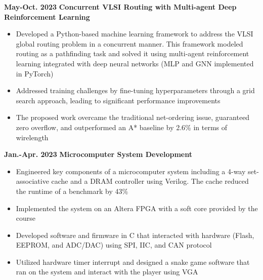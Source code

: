 \documentclass[11pt,a4paper,sans]{moderncv}
\begin{document}
\cventry
{\textnormal{\textbf{May-Oct. 2023}}}
{\textnormal{\textbf{Concurrent VLSI Routing with Multi-agent
Deep Reinforcement Learning}}}
{}{}{}
{
    \begin{itemize}
        \item Developed a Python-based machine learning framework to address the VLSI global routing problem in a concurrent manner. This framework modeled routing as a pathfinding task and solved it using multi-agent reinforcement learning integrated with deep neural networks (MLP and GNN implemented in PyTorch)
        \item Addressed training challenges by fine-tuning hyperparameters through a grid search approach, leading to significant performance improvements
        \item The proposed work overcame the traditional net-ordering issue, guaranteed zero overflow, and outperformed an A* baseline by 2.6\% in terms of wirelength
        \end{itemize}
}


\cventry
{\textnormal{\textbf{Jan.-Apr. 2023}}}
{\textnormal{\textbf{Microcomputer System Development}}}
{}{}{}
{
    \begin{itemize}
    \item Engineered key components of a microcomputer system including a 4-way set-associative cache and a DRAM controller using Verilog. The cache reduced the runtime of a benchmark by 43\%
    \item Implemented the system on an Altera FPGA with a soft core provided by the course 
    \item Developed software and firmware in C that interacted with hardware (Flash, EEPROM, and ADC/DAC) using SPI, IIC, and CAN protocol 
    \item Utilized hardware timer interrupt and designed a snake game software that ran on the system and interact with the player using VGA
    \end{itemize}
}
\end{document}
